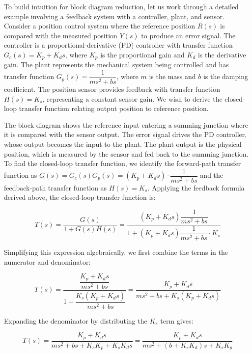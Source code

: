 To build intuition for block diagram reduction, let us work through a detailed example involving a feedback system with a controller, plant, and sensor. Consider a position control system where the reference position $R(s)$ is compared with the measured position $Y(s)$ to produce an error signal. The controller is a proportional-derivative (PD) controller with transfer function $G_c(s) = K_p + K_d s$, where $K_p$ is the proportional gain and $K_d$ is the derivative gain. The plant represents the mechanical system being controlled and has transfer function $G_p(s) = \dfrac{1}{ms^2 + b s}$, where $m$ is the mass and $b$ is the damping coefficient. The position sensor provides feedback with transfer function $H(s) = K_s$, representing a constant sensor gain. We wish to derive the closed-loop transfer function relating output position to reference position.

The block diagram shows the reference input entering a summing junction where it is compared with the sensor output. The error signal drives the PD controller, whose output becomes the input to the plant. The plant output is the physical position, which is measured by the sensor and fed back to the summing junction. To find the closed-loop transfer function, we identify the forward-path transfer function as $G(s) = G_c(s)G_p(s) = (K_p + K_d s) \cdot \dfrac{1}{ms^2 + b s}$ and the feedback-path transfer function as $H(s) = K_s$. Applying the feedback formula derived above, the closed-loop transfer function is:

\begin{equation}
T(s) = \frac{G(s)}{1 + G(s)H(s)} = \frac{(K_p + K_d s) \dfrac{1}{ms^2 + b s}}{1 + (K_p + K_d s) \dfrac{1}{ms^2 + b s} \cdot K_s}
\end{equation}

Simplifying this expression algebraically, we first combine the terms in the numerator and denominator:

\begin{equation}
T(s) = \frac{\dfrac{K_p + K_d s}{ms^2 + b s}}{1 + \dfrac{K_s (K_p + K_d s)}{ms^2 + b s}} = \frac{K_p + K_d s}{ms^2 + b s + K_s (K_p + K_d s)}
\end{equation}

Expanding the denominator by distributing the $K_s$ term gives:

\begin{equation}
T(s) = \frac{K_p + K_d s}{ms^2 + b s + K_s K_p + K_s K_d s} = \frac{K_p + K_d s}{ms^2 + (b + K_s K_d) s + K_s K_p}
\end{equation}

